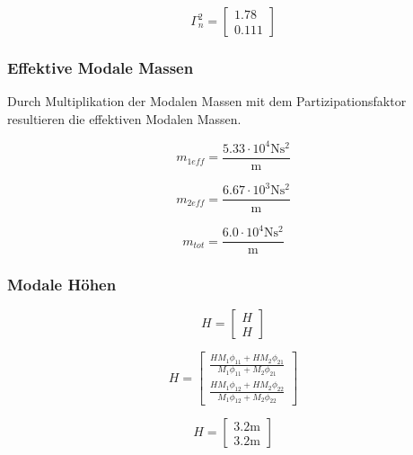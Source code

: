 \documentclass[
  letterpaper,
  DIV=11]{scrreprt}
\begin{document}
\begin{equation}\Gamma^{2}_{n} = \left[\begin{matrix}1.78\\0.111\end{matrix}\right]\end{equation}

\hypertarget{effektive-modale-massen}{%
\subsubsection{Effektive Modale Massen}\label{effektive-modale-massen}}

Durch Multiplikation der Modalen Massen mit dem Partizipationsfaktor
resultieren die effektiven Modalen Massen.

\begin{equation}m_{1eff} = \frac{5.33 \cdot 10^{4} \text{N} \text{s}^{2}}{\text{m}}\end{equation}

\begin{equation}m_{2eff} = \frac{6.67 \cdot 10^{3} \text{N} \text{s}^{2}}{\text{m}}\end{equation}

\begin{equation}m_{tot} = \frac{6.0 \cdot 10^{4} \text{N} \text{s}^{2}}{\text{m}}\end{equation}

\hypertarget{modale-huxf6hen-1}{%
\subsubsection{Modale Höhen}\label{modale-huxf6hen-1}}

\begin{equation}H = \left[\begin{matrix}H\\H\end{matrix}\right]\end{equation}

\begin{equation}H = \left[\begin{matrix}\frac{H M_{1} \phi_{11} + H M_{2} \phi_{21}}{M_{1} \phi_{11} + M_{2} \phi_{21}}\\\frac{H M_{1} \phi_{12} + H M_{2} \phi_{22}}{M_{1} \phi_{12} + M_{2} \phi_{22}}\end{matrix}\right]\end{equation}

\begin{equation}H = \left[\begin{matrix}3.2 \text{m}\\3.2 \text{m}\end{matrix}\right]\end{equation}
\end{document}
